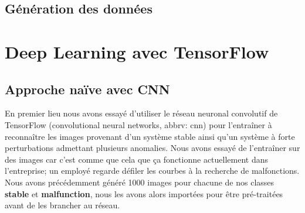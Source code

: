 \documentclass[french]{article}
\theoremstyle{mytheoremstyle}
\theoremstyle{mytheoremstyle}
\theoremstyle{myproblemstyle}
\begin{document}
        \subsection{Génération des données}
    \section{Deep Learning avec TensorFlow}
        \subsection{Approche naïve avec CNN}
       En premier lieu nous avons essayé d'utiliser le réseau neuronal convolutif de TensorFlow (convolutional neural networks, abbrv: cnn) pour l'entraîner à reconnaître les images provenant d'un système stable ainsi qu'un système à forte perturbations admettant plusieurs anomalies. Nous avons essayé de l'entraîner sur des images car c'est comme que cela que ça fonctionne actuellement dans l'entreprise; un employé regarde défiler les courbes à la recherche de malfonctions. Nous avons précédemment généré 1000 images pour chacune de nos classes \textbf{stable} et \textbf{malfunction}, nous les avons alors importées pour être pré-traitées avant de les brancher au réseau.
       
\end{document}
